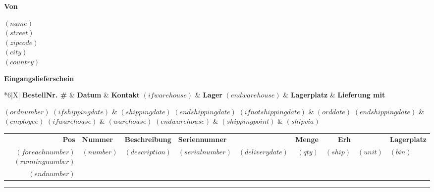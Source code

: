 \documentclass[twoside]{scrartcl}
\begin{document}
\pagestyle{myheadings}
\thispagestyle{empty}

\fontsize{10pt}{12pt}\selectfont


\vspace*{0.5cm}

\parbox[t]{1cm}{\hfill}
\parbox[t]{.5\textwidth}{
\textbf{Von}
\vspace{0.7cm}

$(name)$ \\
$(street)$ \\
$(zipcode)$ \\
$(city)$ \\
$(country)$
}
\hfill

\vspace{1cm}

\textbf{Eingangslieferschein}
\hfill

\vspace{1cm}

\begin{tabularx}{\textwidth}{*{6}{|X}|} \hline
  \textbf{BestellNr. \#} & \textbf{Datum} & \textbf{Kontakt}
  $(if warehouse)$
  & \textbf{Lager}
  $(end warehouse)$
  & \textbf{Lagerplatz} & \textbf{Lieferung mit} \\ [0.5em]
  \hline

  $(ordnumber)$
  $(if shippingdate)$
  & $(shippingdate)$
  $(end shippingdate)$
  $(if not shippingdate)$
  & $(orddate)$
  $(end shippingdate)$
  & $(employee)$
  $(if warehouse)$
  & $(warehouse)$
  $(end warehouse)$
  & $(shippingpoint)$ & $(shipvia)$ \\
  \hline
\end{tabularx}

\vspace{1cm}

\begin{tabularx}{\textwidth}{@{}rlXllrrll@{}}
  \textbf{Pos} & \textbf{Nummer} & \textbf{Beschreibung} & \textbf{Seriennumner} & & \textbf{Menge} & \textbf{Erh} & & \textbf{Lagerplatz} \\

$(foreach number)$
  $(runningnumber)$ & $(number)$ & $(description)$ & $(serialnumber)$ &
  $(deliverydate)$ & $(qty)$ & $(ship)$ & $(unit)$ & $(bin)$ \\
$(end number)$
\end{tabularx}


\rule{\textwidth}{2pt}
\end{document}
